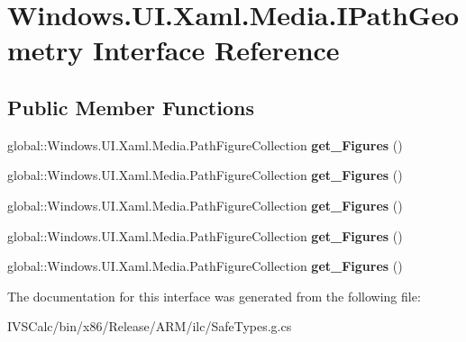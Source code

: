 \hypertarget{interface_windows_1_1_u_i_1_1_xaml_1_1_media_1_1_i_path_geometry}{}\section{Windows.\+U\+I.\+Xaml.\+Media.\+I\+Path\+Geometry Interface Reference}
\label{interface_windows_1_1_u_i_1_1_xaml_1_1_media_1_1_i_path_geometry}
\subsection*{Public Member Functions}
\begin{DoxyCompactItemize}
\item 
\mbox{\label{interface_windows_1_1_u_i_1_1_xaml_1_1_media_1_1_i_path_geometry_a0f26877bf124ef1e13a2a080cfea6217}} 
global\+::\+Windows.\+U\+I.\+Xaml.\+Media.\+Path\+Figure\+Collection {\bfseries get\+\_\+\+Figures} ()
\item 
\mbox{\label{interface_windows_1_1_u_i_1_1_xaml_1_1_media_1_1_i_path_geometry_a0f26877bf124ef1e13a2a080cfea6217}} 
global\+::\+Windows.\+U\+I.\+Xaml.\+Media.\+Path\+Figure\+Collection {\bfseries get\+\_\+\+Figures} ()
\item 
\mbox{\label{interface_windows_1_1_u_i_1_1_xaml_1_1_media_1_1_i_path_geometry_a0f26877bf124ef1e13a2a080cfea6217}} 
global\+::\+Windows.\+U\+I.\+Xaml.\+Media.\+Path\+Figure\+Collection {\bfseries get\+\_\+\+Figures} ()
\item 
\mbox{\label{interface_windows_1_1_u_i_1_1_xaml_1_1_media_1_1_i_path_geometry_a0f26877bf124ef1e13a2a080cfea6217}} 
global\+::\+Windows.\+U\+I.\+Xaml.\+Media.\+Path\+Figure\+Collection {\bfseries get\+\_\+\+Figures} ()
\item 
\mbox{\label{interface_windows_1_1_u_i_1_1_xaml_1_1_media_1_1_i_path_geometry_a0f26877bf124ef1e13a2a080cfea6217}} 
global\+::\+Windows.\+U\+I.\+Xaml.\+Media.\+Path\+Figure\+Collection {\bfseries get\+\_\+\+Figures} ()
\end{DoxyCompactItemize}


The documentation for this interface was generated from the following file\+:\begin{DoxyCompactItemize}
\item 
I\+V\+S\+Calc/bin/x86/\+Release/\+A\+R\+M/ilc/Safe\+Types.\+g.\+cs\end{DoxyCompactItemize}
